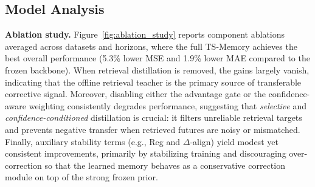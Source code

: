 \subsection{Model Analysis}
\label{sec:model_analysis}

\noindent\textbf{Ablation study.}
\label{sec:model_analysis_ablation}
Figure~\ref{fig:ablation_study} reports component ablations averaged across datasets and horizons, where the full TS-Memory achieves the best overall performance (5.3\% lower MSE and 1.9\% lower MAE compared to the frozen backbone). When retrieval distillation is removed, the gains largely vanish, indicating that the offline retrieval teacher is the primary source of transferable corrective signal. Moreover, disabling either the advantage gate or the confidence-aware weighting consistently degrades performance, suggesting that \textit{selective} and \textit{confidence-conditioned} distillation is crucial: it filters unreliable retrieval targets and prevents negative transfer when retrieved futures are noisy or mismatched. Finally, auxiliary stability terms (e.g., Reg and $\Delta$-align) yield modest yet consistent improvements, primarily by stabilizing training and discouraging over-correction so that the learned memory behaves as a conservative correction module on top of the strong frozen prior.



